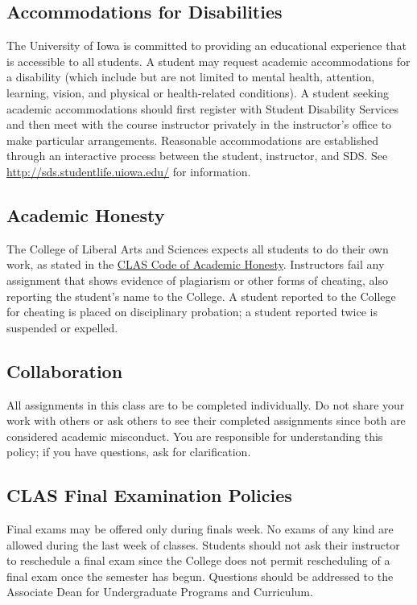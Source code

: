 \documentclass[11pt]{article}\usepackage[]{graphicx}\usepackage[]{color}
\begin{document}
\subsection*{Accommodations for Disabilities}
The University of Iowa is committed to providing an educational experience that is accessible to all students. A student may request academic accommodations for a disability (which include but are not limited to mental health, attention, learning, vision, and physical or health-related conditions). A student seeking academic accommodations should first register with Student Disability Services and then meet with the course instructor privately in the instructor's office to make particular arrangements. Reasonable accommodations are established through an interactive process between the student, instructor, and SDS. See \url{http://sds.studentlife.uiowa.edu/} for information. 

\subsection*{Academic Honesty}
The College of Liberal Arts and Sciences expects all students to do their own work, as stated in the \href{http://clas.uiowa.edu/students/handbook/academic-fraud-honor-code}{CLAS Code of Academic Honesty}. Instructors fail any assignment that shows evidence of plagiarism or other forms of cheating, also reporting the student's name to the College. A student reported to the College for cheating is placed on disciplinary probation; a student reported twice is suspended or expelled.

\subsection*{Collaboration}
All assignments in this class are to be completed individually.  Do not share your work with others or ask others to see their completed assignments since both are considered academic misconduct.  You are responsible for understanding this policy; if you have questions, ask for clarification.

\subsection*{CLAS Final Examination Policies}
Final exams may be offered only during finals week. No exams of any kind are allowed during the last week of classes. Students should not ask their instructor to reschedule a final exam since the College does not permit rescheduling of a final exam once the semester has begun. Questions should be addressed to the Associate Dean for Undergraduate Programs and Curriculum.
\end{document}
